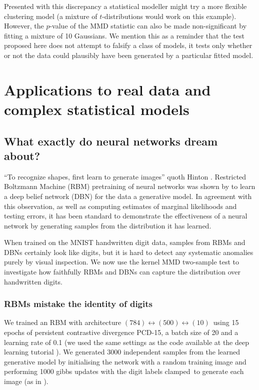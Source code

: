 Presented with this discrepancy a statistical modeller might try a more flexible clustering model \citep[e.g.][]{Peel2000-pv, Iwata2013-yj} (a mixture of $t$-distributions would work on this example).
However, the $p$-value of the MMD statistic can also be made non-significant by fitting a mixture of 10 Gaussians.
We mention this as a reminder that the test proposed here does not attempt to falsify a class of models, it tests only whether or not the data could plausibly have been generated by a particular fitted model.

\section{Applications to real data and complex statistical models}

\subsection{What exactly do neural networks dream about?}

``To recognize shapes, first learn to generate images'' quoth Hinton \citep{Hinton2007-eo}.
Restricted Boltzmann Machine (RBM) pretraining of neural networks was shown by \cite{Hinton2006-yw} to learn a deep belief network (DBN) for the data \ie a generative model.
In agreement with this observation, as well as computing estimates of marginal likelihoods and testing errors, it has been standard to demonstrate the effectiveness of a neural network by generating samples from the distribution it has learned.

When trained on the MNIST handwritten digit data, samples from RBMs and DBNs certainly look like digits, but it is hard to detect any systematic anomalies purely by visual inspection.
We now use the kernel MMD two-sample test to investigate how faithfully RBMs and DBNs can capture the distribution over handwritten digits.

\subsubsection{RBMs mistake the identity of digits}

We trained an RBM with architecture $(784)\leftrightarrow(500)\leftrightarrow(10)$\footnotemark~using 15 epochs of persistent contrastive divergence PCD-15, a batch size of 20 and a learning rate of 0.1 (\ie we used the same settings as the code available at the deep learning tutorial \citep{deep-learning-tutorial}).
We generated 3000 independent samples from the learned generative model by initialising the network with a random training image and performing 1000 gibbs updates with the digit labels clamped\footnotemark~to generate each image (as in \eg \cite{Hinton2007-eo}).

